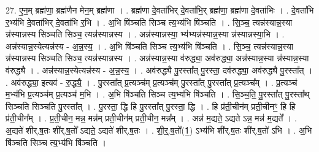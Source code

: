 \documentclass[17pt]{extarticle}
\begin{document}
27. ए॒न॒म् ब्रह्म॑णा॒ ब्रह्म॑णैन मेन॒म् ब्रह्म॑णा । . ब्रह्म॑णा दे॒वता॑भिर् दे॒वता॑भि॒र् ब्रह्म॑णा॒ ब्रह्म॑णा दे॒वता॑भिः । . दे॒वता॑भि र॒भ्य॑भि दे॒वता॑भिर् दे॒वता॑भि र॒भि । . अ॒भि षि॑ञ्चति सिञ्च त्य॒भ्य॑भि षि॑ञ्चति । . सि॒ञ्च॒ त्यन्न॑स्यान्न॒स्या न्न॑स्यान्नस्य सिञ्चति सिञ्च॒ त्यन्न॑स्यान्नस्य । . अन्न॑स्यान्नस्या॒ भ्य॑भ्यन्न॑स्यान्न॒स्या न्न॑स्यान्नस्या॒भि । . अन्न॑स्यान्न॒स्येत्यन्न॑स्य - अ॒न्न॒स्य॒ । . अ॒भि षि॑ञ्चति सिञ्च त्य॒भ्य॑भि षि॑ञ्चति । . सि॒ञ्च॒ त्यन्न॑स्यान्न॒स्या न्न॑स्यान्नस्य सिञ्चति सिञ्च॒ त्यन्न॑स्यान्नस्य । . अन्न॑स्यान्न॒स्या व॑रुद्ध्या॒ अव॑रुद्ध्या॒ अन्न॑स्यान्न॒स्या न्न॑स्यान्न॒स्या व॑रुद्ध्यै । . अन्न॑स्यान्न॒स्येत्यन्न॑स्य - अ॒न्न॒स्य॒ । . अव॑रुद्ध्यै पु॒रस्ता᳚त् पु॒रस्ता॒ दव॑रुद्ध्या॒ अव॑रुद्ध्यै पु॒रस्ता᳚त् । . अव॑रुद्ध्या॒ इत्यव॑ - रु॒द्ध्यै॒ । . पु॒रस्ता᳚त् प्र॒त्यञ्च॑म् प्र॒त्यञ्च॑म् पु॒रस्ता᳚त् पु॒रस्ता᳚त् प्र॒त्यञ्च᳚म् । . प्र॒त्यञ्च॑ म॒भ्य॑भि प्र॒त्यञ्च॑म् प्र॒त्यञ्च॑ म॒भि । . अ॒भि षि॑ञ्चति सिञ्च त्य॒भ्य॑भि षि॑ञ्चति । . सि॒ञ्च॒ति॒ पु॒रस्ता᳚त् पु॒रस्ता᳚थ् सिञ्चति सिञ्चति पु॒रस्ता᳚त् । . पु॒रस्ता॒ द्धि हि पु॒रस्ता᳚त् पु॒रस्ता॒ द्धि । . हि प्र॑ती॒चीन॑म् प्रती॒चीनꣳ॒॒ हि हि प्र॑ती॒चीन᳚म् । . प्र॒ती॒चीन॒ मन्न॒ मन्न॑म् प्रती॒चीन॑म् प्रती॒चीन॒ मन्न᳚म् । . अन्न॑ म॒द्यते॒ ऽद्यते ऽन्न॒ मन्न॑ म॒द्यते᳚ । . अ॒द्यते॑ शीर्.ष॒तः शी॑र्.ष॒तो᳚ ऽद्यते॒ ऽद्यते॑ शीर्.ष॒तः । . शी॒र्॒.ष॒तो᳚(1॒) ऽभ्य॑भि शी॑र्.ष॒तः शी॑र्.ष॒तो॑ ऽभि । . अ॒भि षि॑ञ्चति सिञ्च त्य॒भ्य॑भि षि॑ञ्चति । \newline
\end{document}
